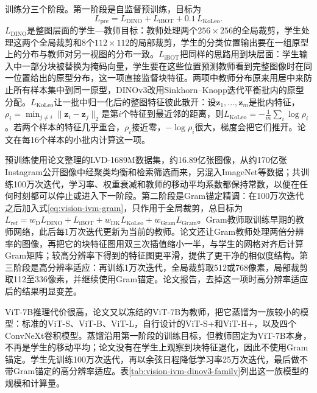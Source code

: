 训练分三个阶段。第一阶段是自监督预训练，目标为
\begin{equation}
  L_{\mathrm{pre}}=L_{\mathrm{DINO}}+L_{\mathrm{iBOT}}+0.1\,L_{\mathrm{KoLeo}}.
  \label{eq:vision-ivm-dinov3-pre}
\end{equation}
$L_{\mathrm{DINO}}$是整图层面的学生—教师目标：教师处理两个$256\times256$的全局裁剪，学生处理这两个全局裁剪和8个$112\times112$的局部裁剪，学生的分类位置输出要在一组原型上的分布与教师对另一视图的分布一致。$L_{\mathrm{iBOT}}$把同样的思路用到块层面：学生输入中一部分块被替换为掩码向量，学生要在这些位置预测教师看到完整图像时在同一位置给出的原型分布，这一项直接监督块特征。两项中教师分布原来用居中来防止所有样本集中到同一原型，DINOv3改用Sinkhorn--Knopp迭代平衡批内的原型分配。$L_{\mathrm{KoLeo}}$让一批中归一化后的整图特征彼此散开：设$\bm z_1,\ldots,\bm z_m$是批内特征，$\rho_i=\min_{j\neq i}\lVert\bm z_i-\bm z_j\rVert_2$是第$i$个特征到最近邻的距离，则$L_{\mathrm{KoLeo}}=-\frac{1}{m}\sum_{i}\log\rho_i$。若两个样本的特征几乎重合，$\rho_i$接近零，$-\log\rho_i$很大，梯度会把它们推开。论文在每16个样本的小批内计算这一项。

预训练使用论文整理的LVD-1689M数据集，约16.89亿张图像，从约170亿张Instagram公开图像中经聚类均衡和检索筛选而来，另混入ImageNet等数据；共训练100万次迭代，学习率、权重衰减和教师的移动平均系数都保持常数，以便在任何时刻都可以停止或进入下一阶段。第二阶段是Gram锚定精调：在100万次迭代之后加入式\eqref{eq:vision-ivm-gram}，只作用于全局裁剪，总目标为$L_{\mathrm{ref}}=w_{\mathrm D}L_{\mathrm{DINO}}+L_{\mathrm{iBOT}}+w_{\mathrm{DK}}L_{\mathrm{KoLeo}}+w_{\mathrm{Gram}}L_{\mathrm{Gram}}$。Gram教师取训练早期的教师网络，此后每1万次迭代更新为当前的教师。论文还让Gram教师处理两倍分辨率的图像，再把它的块特征图用双三次插值缩小一半，与学生的网格对齐后计算Gram矩阵；较高分辨率下得到的特征图更平滑，提供了更干净的相似度结构。第三阶段是高分辨率适应：再训练1万次迭代，全局裁剪取512或768像素，局部裁剪取112至336像素，并继续使用Gram锚定。论文报告，去掉这一项时高分辨率适应后的结果明显变差。

ViT-7B推理代价很高，论文又以冻结的ViT-7B为教师，把它蒸馏为一族较小的模型：标准的ViT-S、ViT-B、ViT-L，自行设计的ViT-S+和ViT-H+，以及四个ConvNeXt卷积模型。蒸馏沿用第一阶段的训练目标，但教师固定为ViT-7B本身，不再是学生的移动平均；论文没有在学生上观察到块特征退化，因此不使用Gram锚定。学生先训练100万次迭代，再以余弦日程降低学习率25万次迭代，最后做不带Gram锚定的高分辨率适应。表\ref{tab:vision-ivm-dinov3-family}列出这一族模型的规模和计算量。

